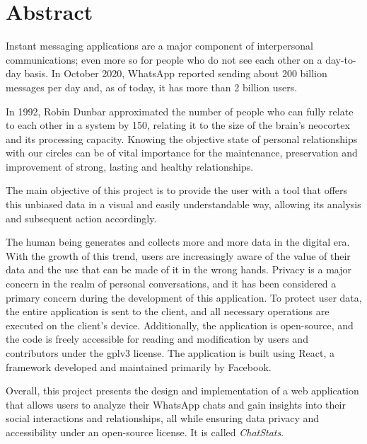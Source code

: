 \cleardoublepage
{}
\chapter*{Abstract}

Instant messaging applications are a major component of interpersonal communications; even more so for people who do not see each other on a day-to-day basis. In October 2020, WhatsApp reported sending about 200 billion messages per day \cite{whatsAppsPerDay} and, as of today, it has more than 2 billion users.\cite{whatsAppsUsers}

In 1992, Robin Dunbar approximated the number of people who can fully relate to each other in a system by 150, relating it to the size of the brain's neocortex and its processing capacity. \cite{dunbarNumber} Knowing the objective state of personal relationships with our circles can be of vital importance for the maintenance, preservation and improvement of strong, lasting and healthy relationships.

The main objective of this project is to provide the user with a tool that offers this unbiased data in a visual and easily understandable way, allowing its analysis and subsequent action accordingly.


The human being generates and collects more and more data in the digital era. With the growth of this trend, users are increasingly aware of the value of their data and the use that can be made of it in the wrong hands. Privacy is a major concern in the realm of personal conversations, and it has been considered a primary concern during the development of this application. To protect user data, the entire application is sent to the client, and all necessary operations are executed on the client's device. Additionally, the application is open-source, and the code is freely accessible for reading and modification by users and contributors under the \acrfull{gplv3} license.\cite{GPLv3} The application is built using React, a framework developed and maintained primarily by Facebook.

Overall, this project presents the design and implementation of a web application that allows users to analyze their WhatsApp chats and gain insights into their social interactions and relationships, all while ensuring data privacy and accessibility under an open-source license. It is called \textit{ChatStats}.

